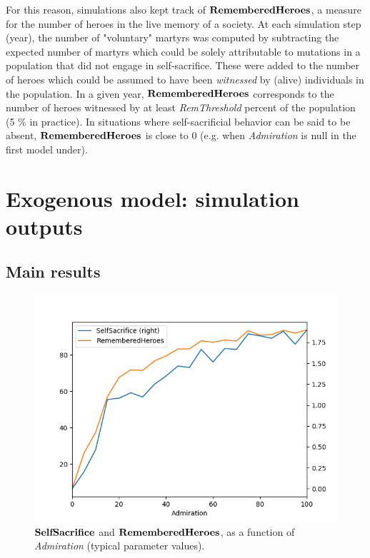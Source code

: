 \documentclass[a4paper,12pt]{report}
\begin{document}
For this reason, simulations also kept track of $\bf{RememberedHeroes}$, a measure for the number of heroes 
in the live memory of a society. At each simulation step (year), the number of "voluntary" martyrs was computed
 by subtracting the expected number of martyrs which could be solely attributable to mutations in a population
 that did not engage in self-sacrifice. These were added to the number of heroes which could be assumed to have
 been \emph{witnessed} by (alive) individuals in the population. In a given year, $\bf{RememberedHeroes}$ corresponds
 to the number of heroes witnessed by at least \emph{RemThreshold} percent of the population (5 \% in practice).
 In situations where self-sacrificial behavior can be said to be absent, $\bf{RememberedHeroes}$ is close to 0
 (e.g. when \emph{Admiration} is null in the first model under).

\section{Exogenous model: simulation outputs}




\subsection{Main results}

\begin{figure}[h]
\centering
\includegraphics[width=1\textwidth]{RGT_10}
\caption{$\bf{SelfSacrifice}$ and $\bf{RememberedHeroes}$, as a function of \emph{Admiration} (typical parameter values).}
\label{fig:RGT_10}
\end{figure}
\end{document}
